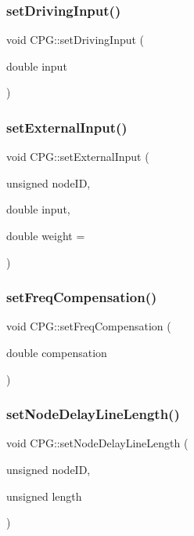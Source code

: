 \subsubsection{\texorpdfstring{set\+Driving\+Input()}{setDrivingInput()}}
{\footnotesize\ttfamily void C\+P\+G\+::set\+Driving\+Input (\begin{DoxyParamCaption}\item[{double}]{input }\end{DoxyParamCaption})}

\mbox{\label{classCPG_add4b14085a01274b19b7a599d2f02af4}} 
\subsubsection{\texorpdfstring{set\+External\+Input()}{setExternalInput()}}
{\footnotesize\ttfamily void C\+P\+G\+::set\+External\+Input (\begin{DoxyParamCaption}\item[{unsigned}]{node\+ID,  }\item[{double}]{input,  }\item[{double}]{weight = {} }\end{DoxyParamCaption})}

\mbox{\label{classCPG_a6a7d9249a73865d230b9f0308965705e}} 
\subsubsection{\texorpdfstring{set\+Freq\+Compensation()}{setFreqCompensation()}}
{\footnotesize\ttfamily void C\+P\+G\+::set\+Freq\+Compensation (\begin{DoxyParamCaption}\item[{double}]{compensation }\end{DoxyParamCaption})}

\mbox{\label{classCPG_a79f22916b43191ac6a5be7f5cbe185e4}} 
\subsubsection{\texorpdfstring{set\+Node\+Delay\+Line\+Length()}{setNodeDelayLineLength()}}
{\footnotesize\ttfamily void C\+P\+G\+::set\+Node\+Delay\+Line\+Length (\begin{DoxyParamCaption}\item[{unsigned}]{node\+ID,  }\item[{unsigned}]{length }\end{DoxyParamCaption})}


